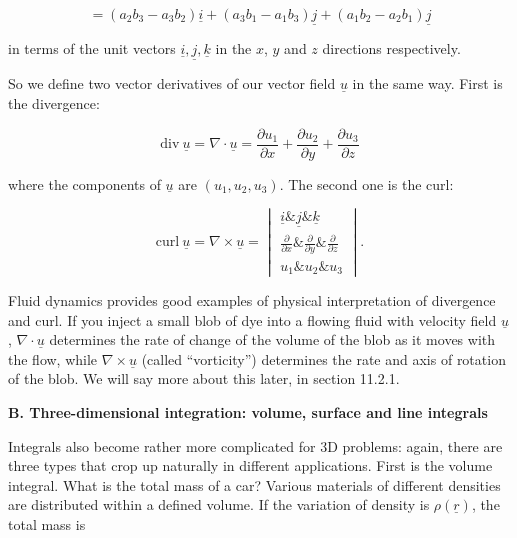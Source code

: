   
  \begin{equation*}=(a_2b_3-a_3b_2)\underline{i}+(a_3b_1-a_1b_3)\underline{j}+(a_1b_2-a_2b_1)\underline{j} 
  \tag{5}\end{equation*} 

  \noindent{}in terms of the unit vectors 
  $\underline{i},\underline{j},\underline{k}$ in the $x$, $y$ and $z$ 
  directions respectively. 

  So we define two vector derivatives of our vector field $\underline{u}$ in 
  the same way. First is the divergence: 

  \begin{equation*}\mathrm{div~} \underline{u} = \nabla \cdot \underline{u} = 
  \dfrac{\partial u_1}{\partial x}+\dfrac{\partial u_2}{\partial 
  y}+\dfrac{\partial u_3}{\partial z} \tag{6}\end{equation*} 

  \noindent{}where the components of $\underline{u}$ are $(u_1,u_2,u_3)$. The 
  second one is the curl: 

  \begin{equation*}\mathrm{curl~} \underline{u} = \nabla \times \underline{u} 
  =\begin{vmatrix} \underline{i}\&\underline{j}\&\underline{k}\\ 
  \frac{\partial}{\partial x}\&\frac{\partial}{\partial 
  y}\&\frac{\partial}{\partial z}\\u_1\&u_2\&u_3 \end{vmatrix} . 
  \tag{7}\end{equation*} 

  Fluid dynamics provides good examples of physical interpretation of 
  divergence and curl. If you inject a small blob of dye into a flowing fluid 
  with velocity field $\underline{u}$, $\nabla \cdot \underline{u}$ determines 
  the rate of change of the volume of the blob as it moves with the flow, while 
  $\nabla \times \underline{u}$ (called ``vorticity'') determines the rate and 
  axis of rotation of the blob. We will say more about this later, in section 
  11.2.1. 

  \textbf{B. Three-dimensional integration: volume, surface and line integrals} 

  Integrals also become rather more complicated for 3D problems: again, there 
  are three types that crop up naturally in different applications. First is 
  the volume integral. What is the total mass of a car? Various materials of 
  different densities are distributed within a defined volume. If the variation 
  of density is $\rho(\underline{r})$, the total mass is 

